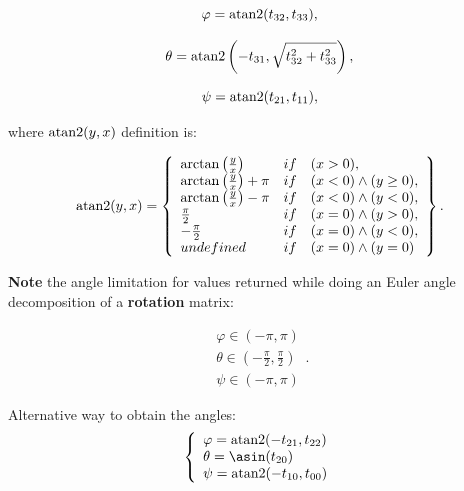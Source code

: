     \begin{equation}
        \varphi = \operatorname{atan2}(t_{32}, t_{33})
    ,\end{equation}

    \begin{equation}
        \theta = \operatorname{atan2} \left(-t_{31}, \sqrt{ t_{32}^{2} + t_{33}^{2}} \right)
    ,\end{equation}

    \begin{equation}
        \psi = \operatorname{atan2}(t_{21}, t_{11})
    ,\end{equation}

    where $\operatorname{atan2}(y, x)$ definition is:

    \begin{equation}
        \operatorname{atan2}(y, x) = \left\{
            \begin{array}{ll}
                \arctan\left(\frac{y}{x}\right) & if \quad (x > 0),\\
                \arctan\left(\frac{y}{x}\right) + \pi & if \quad (x < 0) \land (y \ge 0),\\
                \arctan\left(\frac{y}{x}\right) - \pi & if \quad (x < 0) \land  (y < 0),\\
                \frac{\pi}{2} & if \quad (x = 0) \land  (y > 0),\\
                -\frac{\pi}{2} & if \quad (x = 0) \land  (y < 0),\\
                undefined & if \quad (x = 0) \land (y = 0)
            \end{array}
        \right\}
    .\end{equation}

    \textbf{Note} the angle limitation for values returned while doing
    an Euler angle decomposition of a \textbf{rotation} matrix:

    \begin{equation}
        \begin{array}{l}
            \varphi \in (-\pi, \pi) \\
            \theta \in (-\frac{\pi}{2}, \frac{\pi}{2}) \\
            \psi \in (-\pi, \pi)
        \end{array}
    .\end{equation}

    Alternative way to obtain the angles:
    \begin{equation}
        \left\{ \begin{array}{l}
            \varphi = \atantwo(-t_{21}, t_{22}) \\
            \theta = \asin(t_{20}) \\
            \psi = \atantwo(-t_{10}, t_{00})
        \end{array} \right.
    \end{equation}

